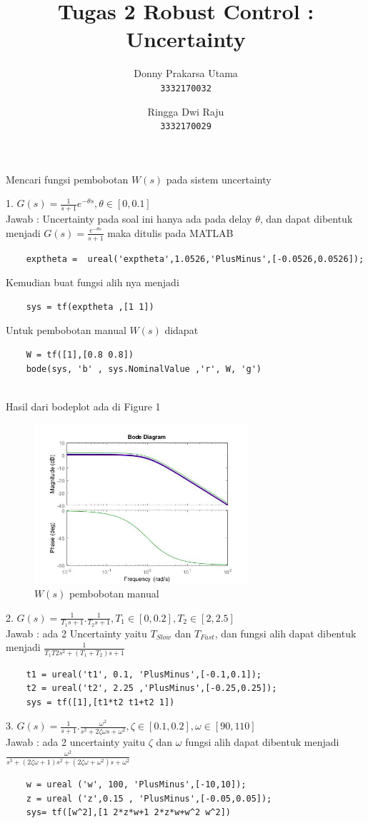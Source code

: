 \documentclass[14pt]{article}
\title{Tugas 2 Robust Control : Uncertainty }
\author{Donny Prakarsa Utama\\ \texttt{3332170032}
\and Ringga Dwi Raju\\ \texttt{3332170029} }
\begin{document}
   
Mencari fungsi pembobotan $W(s)$ pada sistem uncertainty

1. $G(s)=\frac{1}{s+1}e^{-\theta s} ,\theta \in [0,0.1]$\\
Jawab :
Uncertainty pada soal ini hanya ada pada delay $ \theta $, dan dapat dibentuk menjadi $G(s)=\frac{e^{-\theta s}}{s+1}$ maka ditulis pada MATLAB
\begin{verbatim}
    exptheta =  ureal('exptheta',1.0526,'PlusMinus',[-0.0526,0.0526]);
\end{verbatim}
Kemudian buat fungsi alih nya menjadi
\begin{verbatim}
    sys = tf(exptheta ,[1 1])
\end{verbatim} 
Untuk pembobotan manual $W(s)$ didapat 
\begin{verbatim}
    W = tf([1],[0.8 0.8]) 
    bode(sys, 'b' , sys.NominalValue ,'r', W, 'g')
\end{verbatim}\\
Hasil dari bodeplot ada di Figure 1
\begin{figure}[hp]
    \centering
    \includegraphics[width=79mm]{bodemanual1.jpg}
    \caption{$W(s)$ pembobotan manual \label{overflow}}
\end{figure}


2. $G(s)=\frac{1}{T_{1}s+1}.\frac{1}{T_{2}s+1} ,T_{1} \in [0,0.2], T_{2} \in [2,2.5]$ \\

Jawab : ada 2 Uncertainty yaitu $T_{Slow}$ dan $T_{Fast}$, dan fungsi alih dapat dibentuk menjadi $ \frac{1}{T_{1}T{2}s^2 + (T_{1}+T_{2})s + 1}$
\begin{verbatim}
    t1 = ureal('t1', 0.1, 'PlusMinus',[-0.1,0.1]);
    t2 = ureal('t2', 2.25 ,'PlusMinus',[-0.25,0.25]);
    sys = tf([1],[t1*t2 t1+t2 1])
\end{verbatim}

3. $G(s)=\frac{1}{s+1}.\frac{\omega^2}{s^2+2\zeta\omega s+\omega^2},\zeta \in [0.1,0.2],\omega\in[90,110]$\\
Jawab : ada 2 uncertainty yaitu $\zeta$ dan $\omega$ fungsi alih dapat dibentuk menjadi $   \frac{\omega ^2}{s^3+(2 \zeta   \omega +1)s^2+(2 \zeta   \omega + \omega ^2)s+\omega ^2} $
\begin{verbatim}
    w = ureal ('w', 100, 'PlusMinus',[-10,10]);
    z = ureal ('z',0.15 , 'PlusMinus',[-0.05,0.05]);
    sys= tf([w^2],[1 2*z*w+1 2*z*w+w^2 w^2])
\end{verbatim}
\end{document}
